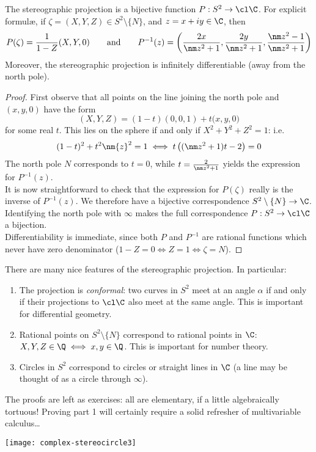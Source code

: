 \begin{thm}
The stereographic projection is a bijective function $P:S^2\to\cl\C$. For explicit formulæ,  if $\zeta=(X,Y,Z)\in S^2\setminus\{N\}$, and $z=x+iy\in \C$, then
\[P(\zeta)=\frac 1{1-Z}(X,Y,0)\qquad\text{and}\qquad P^{-1}(z)=\left(\frac{2x}{\nm z^2+1},\frac{2y}{\nm z^2+1},\frac{\nm z^2-1}{\nm z^2+1}\right)\]
Moreover, the stereographic projection is infinitely differentiable (away from the north pole).
\end{thm}

\begin{proof}
First observe that all points on the line joining the north pole and $(x,y,0)$ have the form
\[(X,Y,Z)=(1-t)(0,0,1)+t\bigl(x,y,0\bigr)\]
for some real $t$. This lies on the sphere if and only if $X^2+Y^2+Z^2=1$: i.e.
\[(1-t)^2+t^2\nm{z}^2=1\iff t\left((\nm z^2+1)t-2\right)=0\]
The north pole $N$ corresponds to $t=0$, while $t=\frac 2{\nm z^2+1}$ yields the expression for $P^{-1}(z)$.\\
It is now straightforward to check that the expression for $P(\zeta)$ really is the inverse of $P^{-1}(z)$. We therefore have a bijective correspondence $S^2\setminus\{N\}\to\C$. Identifying the north pole with $\infty$ makes the full correspondence $P:S^2\to\cl\C$ a bijection.\\
Differentiability is immediate, since both $P$ and $P^{-1}$ are rational functions which never have zero denominator ($1-Z=0\iff Z=1\iff \zeta=N$).
\end{proof}


There are many nice features of the stereographic projection. In particular:
\begin{thm}
\begin{enumerate}
  \item The projection is \emph{conformal}: two curves in $S^2$ meet at an angle $\alpha$ if and only if their projections to $\cl\C$ also meet at the same angle. This is important for differential geometry.
  \item Rational points on $S^2\setminus\{N\}$ correspond to rational points in $\C$: $X,Y,Z\in\Q\iff x,y\in\Q$. This is important for number theory.
  \item Circles in $S^2$ correspond to circles or straight lines in $\C$ (a line may be thought of as a circle through $\infty$).
\end{enumerate}
\end{thm}


\begin{minipage}[t]{0.5\linewidth}\vspace{0pt}
The proofs are left as exercises: all are elementary, if a little algebraically tortuous! Proving part 1 will certainly require a solid refresher of multivariable calculus\ldots\\

\end{minipage}\begin{minipage}[t]{0.5\linewidth}\vspace{0pt}
\flushright\texttt{[image: complex-stereocircle3]}
\end{minipage}

